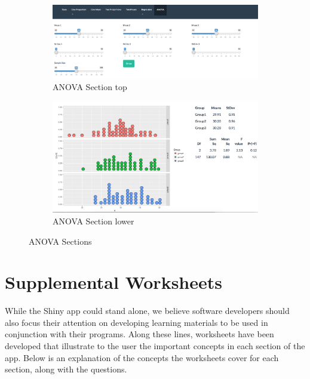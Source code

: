 \documentclass[11pt]{book}
\begin{document}
\begin{figure}
        \centering

        \begin{subfigure}[b]{0.75\textwidth}
                \includegraphics[width=\textwidth]{ANOVAUP.png}
                \caption{ANOVA Section top }
                \label{fig:ANOVAUP}
        \end{subfigure}%

        \begin{subfigure}[b]{0.75\textwidth}
                \includegraphics[width=\textwidth]{ANOVALOW.png}
                \caption{ANOVA Section lower} 
                \label{fig:ANOVALOW}
        \end{subfigure}

\caption {ANOVA Sections}
\end{figure}

\section{Supplemental Worksheets}

While the Shiny app could stand alone, we believe software developers should also focus their attention on developing learning materials to be used in conjunction with their programs. Along these lines, worksheets have been developed that illustrate to the user the important concepts in each section of the app. Below is an explanation of the concepts the worksheets cover for each section, along with the questions. 
\end{document}
